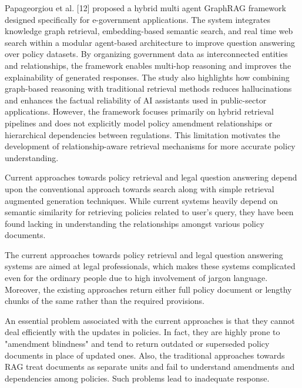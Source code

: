 \documentclass[conference]{IEEEtran}
\begin{document}
Papageorgiou et al. [12] proposed a hybrid multi agent GraphRAG framework designed specifically for e-government applications. The system integrates knowledge graph retrieval, embedding-based semantic search, and real time web search within a modular agent-based architecture to improve question answering over policy datasets. By organizing government data as interconnected entities and relationships, the framework enables multi-hop reasoning and improves the explainability of generated responses. The study also highlights how combining graph-based reasoning with traditional retrieval methods reduces hallucinations and enhances the factual reliability of AI assistants used in public-sector applications. However, the framework focuses primarily on hybrid retrieval pipelines and does not explicitly model policy amendment relationships or hierarchical dependencies between regulations. This limitation motivates the development of relationship-aware retrieval mechanisms for more accurate policy understanding.

Current approaches towards policy retrieval and legal question answering depend upon the conventional approach towards search along with simple retrieval augmented generation techniques. While current systems heavily depend on semantic similarity for retrieving policies related to user's query, they have been found lacking in understanding the relationships amongst various policy documents.

The current approaches towards policy retrieval and legal question answering systems are aimed at legal professionals, which makes these systems complicated even for the ordinary people due to high involvement of jargon language. Moreover, the existing approaches return either full policy document or lengthy chunks of the same rather than the required provisions.

An essential problem associated with the current approaches is that they cannot deal efficiently with the updates in policies. In fact, they are highly prone to "amendment blindness" and tend to return outdated or superseded policy documents in place of updated ones. Also, the traditional approaches towards RAG treat documents as separate units and fail to understand amendments and dependencies among policies. Such problems lead to inadequate response.
\end{document}
